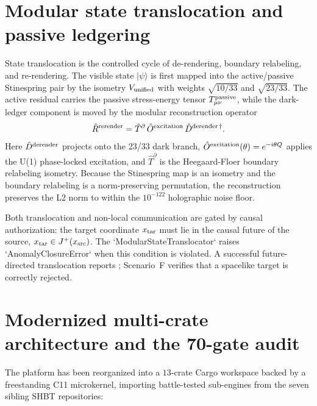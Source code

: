 \documentclass[aps,pra,10pt,onecolumn,superscriptaddress,nofootinbib,longbibliography,floatfix]{revtex4-2}
\newcommand{\ExoticCrateCount}{13}%
\begin{document}
\section{Modular state translocation and passive ledgering}\label{sec:transloc}

State translocation is the controlled cycle of de-rendering, boundary relabeling, and re-rendering.  The visible state $|\psi\rangle$ is first mapped into the active/passive Stinespring pair by the isometry $V_{\rm unified}$ with weights $\sqrt{10/33}$ and $\sqrt{23/33}$.  The active residual carries the passive stress-energy tensor $T_{\mu\nu}^{\rm passive}$, while the dark-ledger component is moved by the modular reconstruction operator
\begin{equation}
\hat R^{\rm rerender} = \hat T^{\partial}\,\hat O^{\rm excitation}\,\hat D^{\rm derender\,\dagger}.
\end{equation}
Here $\hat D^{\rm derender}$ projects onto the 23/33 dark branch, $\hat O^{\rm excitation}(\theta)=e^{-i\theta Q}$ applies the U(1) phase-locked excitation, and $\hat T^{\partial}$ is the Heegaard-Floer boundary relabeling isometry.  Because the Stinespring map is an isometry and the boundary relabeling is a norm-preserving permutation, the reconstruction preserves the L2 norm to within the $10^{-122}$ holographic noise floor.

Both translocation and non-local communication are gated by causal authorization: the target coordinate $x_{\rm tar}$ must lie in the causal future of the source, $x_{\rm tar}\in J^+(x_{\rm src})$.  The `ModularStateTranslocator` raises `AnomalyClosureError` when this condition is violated.  A successful future-directed translocation reports \ExoticTranslocCausalPass{}; Scenario~F verifies that a spacelike target is correctly rejected.

\section{Modernized multi-crate architecture and the 70-gate audit}\label{sec:modern}

The platform has been reorganized into a $\ExoticCrateCount$-crate Cargo workspace backed by a freestanding C11 microkernel, importing battle-tested sub-engines from the seven sibling SHBT repositories:
\end{document}
